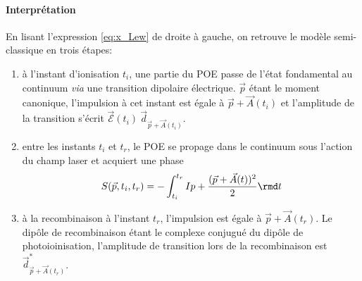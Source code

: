 \paragraph{Interprétation} En lisant l'expression \ref{eq:x_Lew} de droite à gauche, on retrouve le modèle semi-classique en trois étapes:
\begin{enumerate}[label=(\arabic*)]
\item à l'instant d'ionisation $t_i$, une partie du POE passe de l'état fondamental au continuum \textit{via} une transition dipolaire électrique. $\vec{p}$ étant le moment canonique, l'impulsion à cet instant est égale à $\vec{p} + \vec{A}(t_i)$ et l'amplitude de la transition s'écrit $\vec{\mathcal{E}}(t_i) \: \vec{d}_{\vec{p}+\vec{A}(t_i)}$.
\item entre les instants $t_i$ et $t_r$, le POE se propage dans le continuum sous l'action du champ laser et acquiert une phase 
\begin{equation}
S(\vec{p}, t_i, t_r) = - \int_{t_i}^{t_r} Ip + \frac{(\vec{p} + \vec{A}(t))^2}{2} \rmd t
\end{equation}
\item à la recombinaison à l'instant $t_r$, l'impulsion est égale à $\vec{p} + \vec{A}(t_r)$. Le dipôle de recombinaison étant le complexe conjugué du dipôle de photoioinisation, l'amplitude de transition lors de la recombinaison est $\vec{d}^*_{\vec{p}+\vec{A}(t_r)}$.
\end{enumerate}

